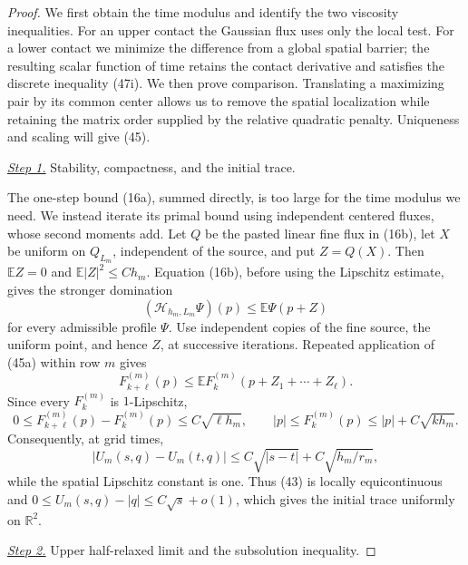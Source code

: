 \documentclass{smfart}
\theoremstyle{definition}
\newcommand{\1}{\mathbf 1}
\begin{document}
\begin{proof}
We first obtain the time modulus and identify the two viscosity
inequalities.  For an upper contact the Gaussian flux uses only the
local test.  For a lower contact we minimize the difference from a
global spatial barrier; the resulting scalar function of time retains
the contact derivative and satisfies the discrete inequality (47i).
We then prove comparison.  Translating a maximizing pair by its
common center allows us to remove the spatial localization while
retaining the matrix order supplied by the relative quadratic
penalty.  Uniqueness and scaling will give (45).

\smallskip\noindent
\underline{\textit{Step 1.}} Stability, compactness, and the initial trace.

The one-step bound (16a), summed directly, is too large for the time
modulus we need.  We instead iterate its primal bound using
independent centered fluxes, whose second moments add.
Let $Q$ be the pasted linear fine flux in (16b), let $X$ be uniform
on $Q_{L_m}$, independent of the source, and put $Z=Q(X)$.  Then
$\mathbb EZ=0$ and
$\mathbb E|Z|^2\leq Ch_ m$.  Equation (16b), before using the
Lipschitz estimate, gives the stronger domination
\begin{equation}
(\mathcal H_ {h_ m,L_ m}\Psi)(p)\leq\mathbb E\Psi(p+Z)
\tag{45a}
\end{equation}
for every admissible profile $\Psi$.  Use independent copies of the
fine source, the uniform point, and hence $Z$, at successive
iterations.  Repeated application of (45a) within row $m$ gives
\begin{equation*}
F_{k+\ell}^{(m)}(p)
\leq\mathbb E F_k^{(m)}(p+Z_ 1+\cdots+Z_ \ell).
\end{equation*}
Since every $F_k^{(m)}$ is $1$-Lipschitz,
\begin{equation}
0\leq F_{k+\ell}^{(m)}(p)-F_k^{(m)}(p)\leq C\sqrt{\ell h_m},
\qquad |p|\leq F_k^{(m)}(p)\leq|p|+C\sqrt{k h_m}.
\tag{46}
\end{equation}
Consequently, at grid times,
\begin{equation}
|U_ m(s,q)-U_ m(t,q)|
\leq C\sqrt{|s-t|}+C\sqrt{h_ m/r_ m},
\tag{46a}
\end{equation}
while the spatial Lipschitz constant is one.  Thus (43) is locally
equicontinuous and
$0\leq U_ m(s,q)-|q|\leq C\sqrt s+o(1)$, which gives the initial
trace uniformly on $\mathbb R^2$.

\smallskip\noindent
\underline{\textit{Step 2.}} Upper half-relaxed limit and the subsolution inequality.


\end{proof}
\end{document}
